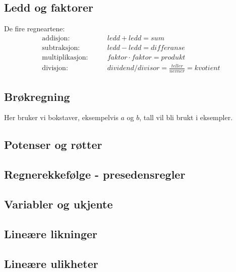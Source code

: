 \subsection{Ledd og faktorer} 
De fire regneartene:
\begin{align*}
    \text{addisjon: }& &&ledd + ledd = sum \\
    \text{subtraksjon: }& &&ledd - ledd = differanse \\
    \text{multiplikasjon: }& &&faktor \cdot faktor = produkt \\
    \text{divisjon: }& &&dividend / divisor = \frac{teller}{nevner} = kvotient
\end{align*}
\subsection{Brøkregning}
Her bruker vi bokstaver, eksempelvis $a$ og $b$, tall vil bli brukt i eksempler.
\subsection{Potenser og røtter}
\subsection{Regnerekkefølge - presedensregler} 
\subsection{Variabler og ukjente} 
\subsection{Lineære likninger} 
\subsection{Lineære ulikheter}

